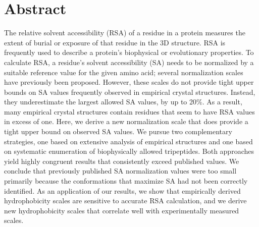 \documentclass[11pt]{article}
\begin{document}
\section*{Abstract}
The relative solvent accessibility (RSA) of a residue in a protein measures the extent of burial or exposure of that residue in the 3D structure. RSA is frequently used to describe a protein's biophysical or evolutionary properties. To calculate RSA, a residue's solvent accessibility (SA) needs to be normalized by a suitable reference value for the given amino acid; several normalization scales have previously been proposed. However, these scales do not provide tight upper bounds on SA values frequently observed in empirical crystal structures. Instead, they underestimate the largest allowed SA values, by up to 20\%. As a result, many empirical crystal structures contain residues that seem to have RSA values in excess of one. Here, we derive a new normalization scale that does provide a tight upper bound on observed SA values. We pursue two complementary strategies, one based on extensive analysis of empirical structures and one based on systematic enumeration of biophysically allowed tripeptides. Both approaches yield highly congruent results that consistently exceed published values. We conclude that previously published SA normalization values were too small primarily because the conformations that maximize SA had not been correctly identified. As an application of our results, we show that empirically derived hydrophobicity scales are sensitive to accurate RSA calculation, and we derive new hydrophobicity scales that correlate well with experimentally measured scales.

\end{document}
